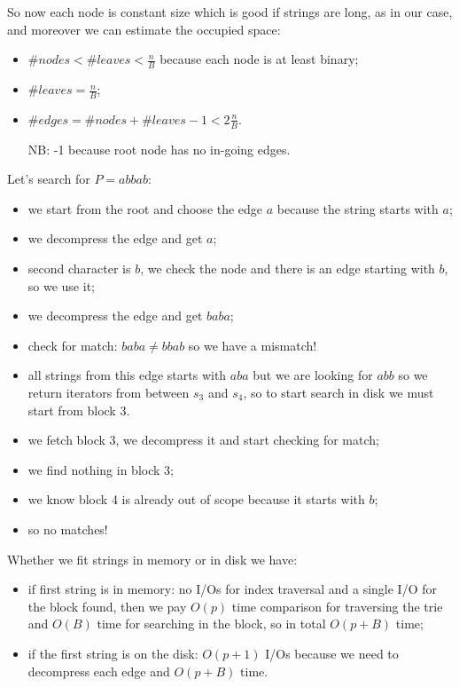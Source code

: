 So now each node is constant size which is good if strings are long, as in our case, and moreover we can estimate the occupied space:
\begin{itemize}
    \item $\#nodes < \#leaves < \frac{n}{B}$ because each node is at least binary;
    \item $\#leaves = \frac{n}{B}$;
    \item $\#edges = \#nodes + \#leaves -1 < 2 \frac{n}{B}$.

    NB: -1 because root node has no in-going edges.
\end{itemize}

Let's search for $P=abbab$:
\begin{itemize}
    \item we start from the root and choose the edge $a$ because the string starts with $a$;
    \item we decompress the edge and get $a$;
    \item second character is $b$, we check the node and there is an edge starting with $b$, so we use it;
    \item we decompress the edge and get $baba$;
    \item check for match: $baba \neq bbab$ so we have a mismatch!
    \item all strings from this edge starts with $aba$ but we are looking for $abb$ so we return iterators from between $s_3$ and $s_4$, so to start search in disk we must start from block 3.

    \item we fetch block 3, we decompress it and start checking for match;
    \item we find nothing in block 3;
    \item we know block 4 is already out of scope because it starts with $b$;
    \item so no matches!
\end{itemize}

Whether we fit strings in memory or in disk we have:
\begin{itemize}
    \item if first string is in memory: no I/Os for index traversal and a single I/O for the block found, then we pay $O(p)$ time comparison for traversing the trie and $O(B)$ time for searching in the block, so in total $O(p + B)$ time;
    \item if the first string is on the disk: $O(p+1)$ I/Os because we need to decompress each edge and $O(p+B)$ time.
\end{itemize}

